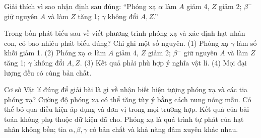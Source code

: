 \begin{bt}
Giải thích vì sao nhận định sau đúng: “Phóng xạ $\alpha$ làm $A$ giảm 4, $Z$ giảm 2; $\beta^-$ giữ nguyên $A$ và làm $Z$ tăng 1; $\gamma$ không đổi $A,Z$.”
\end{bt}

\begin{ex}
Trong bốn phát biểu sau về viết phương trình phóng xạ và xác định hạt nhân con, có bao nhiêu phát biểu đúng? Chỉ ghi một số nguyên. (1) Phóng xạ $\gamma$ làm số khối giảm 1. (2) Phóng xạ $\alpha$ làm $A$ giảm 4, $Z$ giảm 2; $\beta^-$ giữ nguyên $A$ và làm $Z$ tăng 1; $\gamma$ không đổi $A,Z$. (3) Kết quả phải phù hợp ý nghĩa vật lí. (4) Mọi đại lượng đều có cùng bản chất.
\end{ex}

\begin{ex}
Cơ sở Vật lí đúng để giải bài là gì về nhận biết hiện tượng phóng xạ và các tia phóng xạ?
\choice
{Cường độ phóng xạ có thể tăng tùy ý bằng cách nung nóng mẫu.}
{Có thể bỏ qua điều kiện áp dụng và đơn vị trong mọi trường hợp.}
{Kết quả của bài toán không phụ thuộc dữ kiện đã cho.}
{\True Phóng xạ là quá trình tự phát của hạt nhân không bền; tia $\alpha,\beta,\gamma$ có bản chất và khả năng đâm xuyên khác nhau.}
\end{ex}


